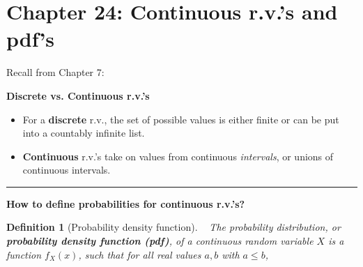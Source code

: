 \documentclass[12pt]{amsart}
\newtheorem{definition}[theorem]{Definition}
\begin{document}
\setcounter{section}{24}
{\huge  
\section*{Chapter 24: Continuous r.v.'s and pdf's }
}

{\large 




\vspace{.5cm}

Recall from Chapter 7:

\textbf{Discrete vs. Continuous r.v.'s}
\begin{itemize}
\item For a \textbf{discrete} r.v., the set of possible values is either finite or can be put into a countably infinite list.
\item \textbf{Continuous} r.v.'s take on values from continuous \textit{intervals}, or unions of continuous intervals.
\end{itemize}

\vspace{.5cm}
\hrule
\vspace{.5cm}


\textbf{How to define probabilities for continuous r.v.'s?}

\vspace{9cm}

\begin{definition}[Probability density function]\ \newline
The probability distribution, or \textbf{probability density function (pdf)}, of a continuous random variable $X$ is a function $f_X(x)$, such that for all real values $a,b$ with $a \leq b$,


\end{definition}}
\end{document}
